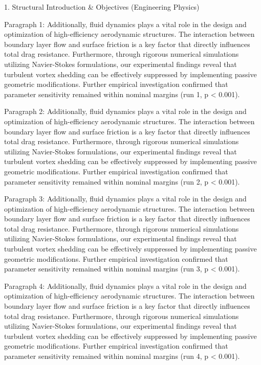 1. Structural Introduction & Objectives (Engineering Physics)


Paragraph 1: Additionally, fluid dynamics plays a vital role in the design and optimization of high-efficiency aerodynamic structures. The interaction between boundary layer flow and surface friction is a key factor that directly influences total drag resistance. Furthermore, through rigorous numerical simulations utilizing Navier-Stokes formulations, our experimental findings reveal that turbulent vortex shedding can be effectively suppressed by implementing passive geometric modifications. Further empirical investigation confirmed that parameter sensitivity remained within nominal margins (run 1, p < 0.001).

Paragraph 2: Additionally, fluid dynamics plays a vital role in the design and optimization of high-efficiency aerodynamic structures. The interaction between boundary layer flow and surface friction is a key factor that directly influences total drag resistance. Furthermore, through rigorous numerical simulations utilizing Navier-Stokes formulations, our experimental findings reveal that turbulent vortex shedding can be effectively suppressed by implementing passive geometric modifications. Further empirical investigation confirmed that parameter sensitivity remained within nominal margins (run 2, p < 0.001).

Paragraph 3: Additionally, fluid dynamics plays a vital role in the design and optimization of high-efficiency aerodynamic structures. The interaction between boundary layer flow and surface friction is a key factor that directly influences total drag resistance. Furthermore, through rigorous numerical simulations utilizing Navier-Stokes formulations, our experimental findings reveal that turbulent vortex shedding can be effectively suppressed by implementing passive geometric modifications. Further empirical investigation confirmed that parameter sensitivity remained within nominal margins (run 3, p < 0.001).

Paragraph 4: Additionally, fluid dynamics plays a vital role in the design and optimization of high-efficiency aerodynamic structures. The interaction between boundary layer flow and surface friction is a key factor that directly influences total drag resistance. Furthermore, through rigorous numerical simulations utilizing Navier-Stokes formulations, our experimental findings reveal that turbulent vortex shedding can be effectively suppressed by implementing passive geometric modifications. Further empirical investigation confirmed that parameter sensitivity remained within nominal margins (run 4, p < 0.001).

